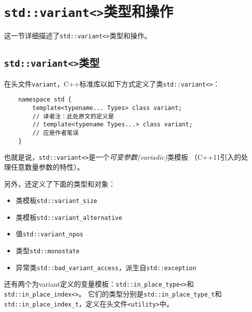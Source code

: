 \section{\texttt{std::variant<>}类型和操作}
这一节详细描述了\texttt{std::variant<>}类型和操作。

\subsection{\texttt{std::variant<>}类型}
在头文件\texttt{variant}，C++标准库以如下方式定义了类\texttt{std::variant<>}：
\begin{lstlisting}
    namespace std {
        template<typename... Types> class variant;
        // 译者注：此处原文的定义是
        // template<typename Types...> class variant;
        // 应是作者笔误
    }
\end{lstlisting}
也就是说，\texttt{std::variant<>}是一个\emph{可变参数(variadic)}类模板
（C++11引入的处理任意数量参数的特性）。

另外，还定义了下面的类型和对象：
\begin{itemize}
    \item 类模板\texttt{std::variant\_size}
    \item 类模板\texttt{std::variant\_alternative}
    \item 值\texttt{std::variant\_npos}
    \item 类型\texttt{std::monostate}
    \item 异常类\texttt{std::bad\_variant\_access}，派生自\texttt{std::exception}
\end{itemize}
还有两个为variant定义的变量模板：\texttt{std::in\_place\_type<>}和\texttt{std::in\_place\_index<>}。
它们的类型分别是\texttt{std::in\_place\_type\_t}和
\texttt{std::in\_place\_index\_t}，定义在头文件\texttt{<utility>}中。

